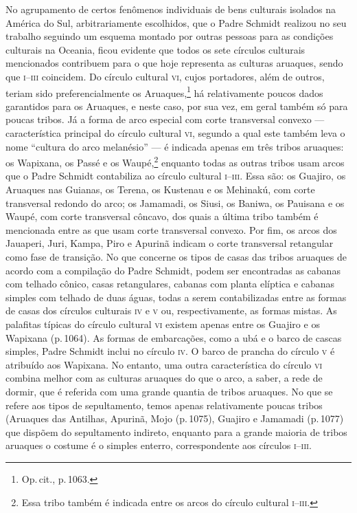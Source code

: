 
No agrupamento de certos fenômenos individuais de bens culturais
isolados na América do Sul, arbitrariamente escolhidos, que o Padre
Schmidt realizou no seu trabalho seguindo um esquema montado por outras
pessoas para as condições culturais na Oceania, ficou evidente que
todos os sete círculos culturais mencionados contribuem para o que hoje
representa as culturas aruaques, sendo que \textsc{i--iii} coincidem. Do círculo
cultural \textsc{vi}, cujos portadores, além de outros, teriam sido
preferencialmente os Aruaques,\footnote{Op.\,cit., p.\,1063.} há
relativamente poucos dados garantidos para os Aruaques, e neste caso,
por sua vez, em geral também só para poucas tribos. Já a forma de arco
especial com corte transversal convexo --- característica principal do
círculo cultural \textsc{vi}, segundo a qual este também leva o nome ``cultura do
arco melanésio'' --- é indicada apenas em três tribos aruaques: os
Wapixana, os Passé e os Waupé,\footnote{Essa tribo também é indicada
  entre os arcos do círculo cultural \textsc{i--iii}.} enquanto todas as outras
tribos usam arcos que o Padre Schmidt contabiliza ao círculo cultural
\textsc{i--iii}. Essa são: os Guajiro, os Aruaques nas Guianas, os Terena, os
Kustenau e os Mehinakú, com corte transversal redondo do arco; os
Jamamadi, os Siusi, os Baniwa, os Pauisana e os Waupé, com corte
transversal côncavo, dos quais a última tribo também é mencionada entre
as que usam corte transversal convexo. Por fim, os arcos dos Jauaperi,
Juri, Kampa, Piro e Apurinã indicam o corte transversal retangular como
fase de transição. No que concerne os tipos de casas das tribos aruaques
de acordo com a compilação do Padre Schmidt, podem ser encontradas as
cabanas com telhado cônico, casas retangulares, cabanas com planta
elíptica e cabanas simples com telhado de duas águas, todas a serem
contabilizadas entre as formas de casas dos círculos culturais \textsc{iv} e \textsc{v}
ou, respectivamente, as formas mistas. As palafitas típicas do círculo
cultural \textsc{vi} existem apenas entre os Guajiro e os Wapixana (p.\,1064). As
formas de embarcações, como a ubá e o barco de cascas simples, Padre
Schmidt inclui no círculo \textsc{iv}. O barco de prancha do círculo \textsc{v} é
atribuído aos Wapixana. No entanto, uma outra característica do círculo
\textsc{vi} combina melhor com as culturas aruaques do que o arco, a saber, a rede
de dormir, que é referida com uma grande quantia de tribos aruaques. No
que se refere aos tipos de sepultamento, temos apenas relativamente
poucas tribos (Aruaques das Antilhas, Apurinã, Mojo (p.\,1075),
Guajiro e Jamamadi (p.\,1077) que dispõem do sepultamento indireto,
enquanto para a grande maioria de tribos aruaques o costume é o simples
enterro, correspondente aos círculos \textsc{i--iii}.

